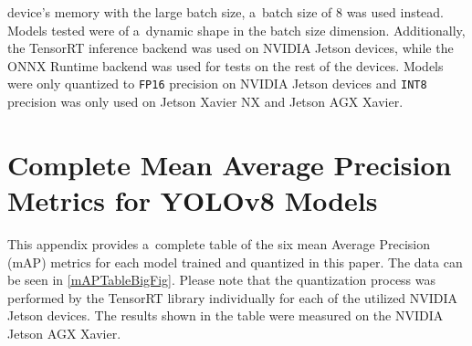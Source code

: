 \begin{appendices}
\begin{table}
\begin{threeparttable}
{        device's memory with the large batch size, a~batch size of 8 was used
        instead. Models tested were of a~dynamic shape in the batch size dimension.
        Additionally, the TensorRT inference backend was used on NVIDIA Jetson
        devices, while the ONNX Runtime backend was used for tests on the rest of
        the devices. Models were only quantized to \texttt{FP16} precision on NVIDIA
        Jetson devices and \texttt{INT8} precision was only used on Jetson Xavier NX
        and Jetson AGX Xavier.}
        \label{mAPvsFPS32}
    \end{threeparttable}
    \normalsize
\end{table}




\chapter{Complete Mean Average Precision Metrics for YOLOv8 Models}
\label{mAPTableBig}

This appendix provides a~complete table of the six mean Average Precision
(mAP) metrics for each model trained and quantized in this paper. The data can
be seen in \autoref{mAPTableBigFig}. Please note that the quantization process
was performed by the TensorRT library individually for each of the utilized
NVIDIA Jetson devices. The results shown in the table were measured on the
NVIDIA Jetson AGX Xavier.


\end{appendices}
